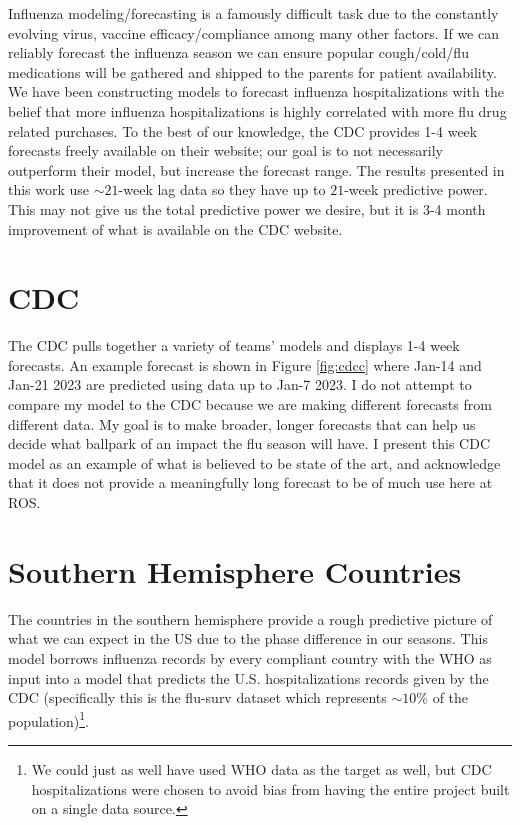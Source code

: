 \documentclass[12pt,a4paper,english]{article}
\begin{document}
Influenza modeling/forecasting is a famously difficult task due to the constantly evolving virus, vaccine efficacy/compliance among many other factors. If we can reliably forecast the influenza season we can ensure popular cough/cold/flu medications will be gathered and shipped to the parents for patient availability. We have been constructing models to forecast influenza hospitalizations with the belief that more influenza hospitalizations is highly correlated with more flu drug related purchases. To the best of our knowledge, the CDC provides 1-4 week forecasts freely available on their website; our goal is to not necessarily outperform their model, but increase the forecast range. The results presented in this work use $\sim 21$-week lag data so they have up to $21$-week predictive power. This may not give us the total predictive power we desire, but it is 3-4 month improvement of what is available on the CDC website.



\section{CDC}




The CDC pulls together a variety of teams' models and displays 1-4 week forecasts. An example forecast is shown in Figure \ref{fig:cdcc} where Jan-14 and Jan-21 2023 are predicted using data up to Jan-7 2023. I do not attempt to compare my model to the CDC because we are making different forecasts from different data. My goal is to make broader, longer forecasts that can help us decide what ballpark of an impact the flu season will have. I present this CDC model as an example of what is believed to be state of the art, and acknowledge that it does not provide a meaningfully long forecast to be of much use here at ROS. 




\section{Southern Hemisphere Countries}

The countries in the southern hemisphere provide a rough predictive picture of what we can expect in the US due to the phase difference in our seasons.  This model borrows influenza records by every compliant country with the WHO as input into a model that predicts the U.S. hospitalizations records given by the CDC (specifically this is the flu-surv dataset which represents $\sim10\%$ of the population)\footnote{We could just as well have used WHO data as the target as well, but CDC hospitalizations were chosen to avoid bias from having the entire project built on a single data source.}.  
\end{document}
